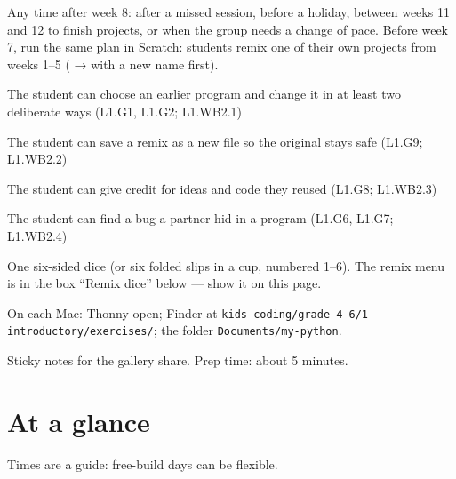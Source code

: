 
\begin{teachernote}
Any time after week 8: after a missed session, before a holiday, between weeks 11 and 12 to finish projects, or when the group needs a change of pace. Before week 7, run the same plan in Scratch: students remix one of their own projects from weeks 1--5 ( →  with a new name first).
\end{teachernote}

\begin{objectives}
  \item The student can choose an earlier program and change it in at least two deliberate ways (L1.G1, L1.G2; L1.WB2.1)
  \item The student can save a remix as a new file so the original stays safe (L1.G9; L1.WB2.2)
  \item The student can give credit for ideas and code they reused (L1.G8; L1.WB2.3)
  \item The student can find a bug a partner hid in a program (L1.G6, L1.G7; L1.WB2.4)
\end{objectives}

\begin{materials}
  \item One six-sided dice (or six folded slips in a cup, numbered 1--6). The remix menu is in the box \enquote{Remix dice} below --- show it on this page.
  \item On each Mac: Thonny open; Finder at \texttt{kids-coding/grade-4-6/1-introductory/exercises/}; the folder \texttt{Documents/my-python}.
  \item Sticky notes for the gallery share. Prep time: about 5 minutes.
\end{materials}

\section{At a glance}
Times are a guide: free-build days can be flexible.
\begin{timeplan}
\end{timeplan}

